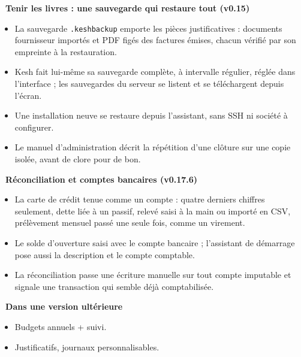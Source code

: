 \documentclass[a4paper,11pt,oneside]{article}
\begin{document}
\vspace{0.4cm}

\textbf{\color{keshSuccess}\faCheckCircle\ Tenir les livres : une sauvegarde qui restaure tout (v0.15)}

\begin{itemize}
    \item La sauvegarde \texttt{.keshbackup} emporte les pièces justificatives : documents fournisseur importés et PDF figés des factures émises, chacun vérifié par son empreinte à la restauration.
    \item Kesh fait lui-même sa sauvegarde complète, à intervalle régulier, réglée dans l'interface ; les sauvegardes du serveur se listent et se téléchargent depuis l'écran.
    \item Une installation neuve se restaure depuis l'assistant, sans SSH ni société à configurer.
    \item Le manuel d'administration décrit la répétition d'une clôture sur une copie isolée, avant de clore pour de bon.
\end{itemize}

\vspace{0.4cm}

\textbf{\color{keshSuccess}\faCheckCircle\ Réconciliation et comptes bancaires (v0.17.6)}

\begin{itemize}
    \item La carte de crédit tenue comme un compte : quatre derniers chiffres seulement, dette liée à un passif, relevé saisi à la main ou importé en CSV, prélèvement mensuel passé une seule fois, comme un virement.
    \item Le solde d'ouverture saisi avec le compte bancaire ; l'assistant de démarrage pose aussi la description et le compte comptable.
    \item La réconciliation passe une écriture manuelle sur tout compte imputable et signale une transaction qui semble déjà comptabilisée.
\end{itemize}

\vspace{0.4cm}

\textbf{\color{keshWarning}\faClock\ Dans une version ultérieure}

\begin{itemize}
    \item Budgets annuels + suivi.
    \item Justificatifs, journaux personnalisables.
\end{itemize}
\end{document}
